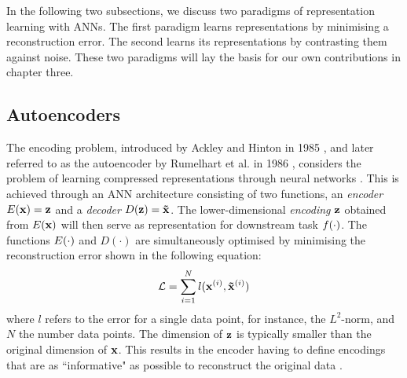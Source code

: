 In the following two subsections, we discuss two paradigms of representation learning with ANNs. The first paradigm learns representations by minimising a reconstruction error. The second learns its representations by contrasting them against noise. These two paradigms will lay the basis for our own contributions in chapter three.

\subsection{Autoencoders}
The encoding problem, introduced by Ackley and Hinton in 1985 \citep{ackleyLearningAlgorithmBoltzmann1985}, and later referred to as the autoencoder by Rumelhart et al. in 1986 \citep{rumelhartLearningInternalRepresentations1988}, considers the problem of learning compressed representations through neural networks \citep{rumelhartLearningInternalRepresentations1988, bankAutoencoders2021}. This is achieved through an ANN architecture consisting of two functions, an \textit{encoder} $E(\mathbf{x}) = \mathbf{z}$ and a \textit{decoder} $D(\mathbf{z}) = \mathbf{\tilde{x}}$.
The lower-dimensional \textit{encoding} $\mathbf{z}$ obtained from $E(\mathbf{x})$ will then serve as representation for downstream task $f(\cdot)$.
The functions $E(\cdot)$ and $D(\cdot)$ are simultaneously optimised by minimising the reconstruction error shown in the following equation:
\begin{equation}
	\mathcal{L} = \sum_{i = 1}^N l(\mathbf{x}^{(i)}, \mathbf{\tilde{x}}^{(i)})
\end{equation}
where $l$ refers to the error for a single data point, for instance, the $L^2$-norm, and $N$ the number data points. The dimension of $\mathbf{z}$ is typically smaller than the original dimension of $\mathbf{x}$. This results in the encoder having to define encodings that are as ``informative" as possible to reconstruct the original data \citep{bankAutoencoders2021}.

